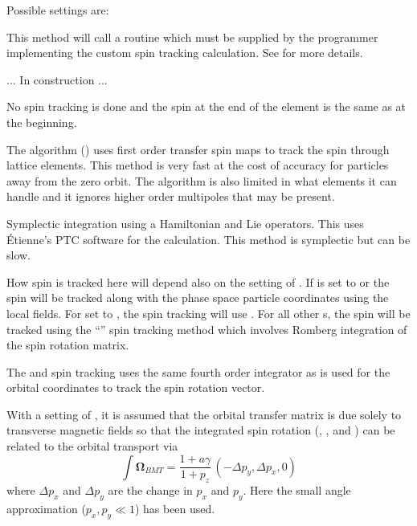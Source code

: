 Possible  settings are:
\begin{description}
%
\item[\vn{Custom}] \Newline
This method will call a routine  which must be supplied by the programmer
implementing the custom spin tracking calculation. See  for more details.
%
\item[\vn{Magnus}] \Newline
... In construction ...
%
\item[\vn{Off}] \Newline
No spin tracking is done and the spin at the end of the element is the same as at the beginning.
%
\item[\vn{Sprint}] \Newline
The  algorithm () uses first order transfer spin maps to track the
spin through lattice elements. This method is very fast at the cost of accuracy for particles away
from the zero orbit. The algorithm is also limited in what elements it can handle and it ignores
higher order multipoles that may be present.
%
\item[\vn{Symp_Lie_PTC}] \Newline
Symplectic integration using a Hamiltonian and Lie operators.  This uses \'Etienne's PTC software
for the calculation.  This method is symplectic but can be slow.
%
\item[\vn{Tracking}] \Newline
How spin is tracked here will depend also on the setting of . If
 is set to  or  the spin will be tracked
along with the phase space particle coordinates using the local fields. For  set
to , the spin tracking will use .  For all other s, the
spin will be tracked using the ``'' spin tracking method which involves Romberg
integration of the spin rotation matrix.

The  and  spin tracking uses the same fourth order integrator
as is used for the orbital coordinates to track the spin rotation vector.
%
\item[\vn{Transverse_Kick}] \Newline
With a setting of , it is assumed that the orbital transfer matrix is due solely
to transverse magnetic fields so that the integrated spin rotation (, , and
) can be related to the orbital transport via
\begin{equation}
  \int {\pmb\Omega}_{BMT} = \frac{1 + a \gamma}{1 + p_z} \, (-\Delta p_y, \Delta p_x, 0)
\end{equation}
where $\Delta p_x$ and $\Delta p_y$ are the change in $p_x$ and $p_y$.
Here the small angle approximation ($p_x, p_y \ll 1$) has been used.
\end{description}



